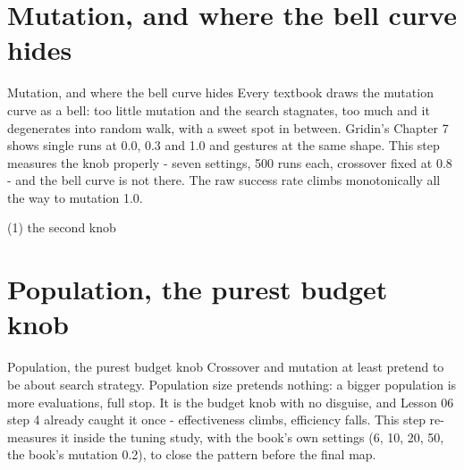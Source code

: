 
\section{Mutation, and where the bell curve hides}

\begin{frame}{Mutation, and where the bell curve hides}
Every textbook draws the mutation curve as a bell: too little mutation and
the search stagnates, too much and it degenerates into random walk, with a
sweet spot in between. Gridin's Chapter 7 shows single runs at 0.0, 0.3 and
1.0 and gestures at the same shape. This step measures the knob properly -
seven settings, 500 runs each, crossover fixed at 0.8 - and the bell curve
is not there. The raw success rate climbs monotonically all the way to
mutation 1.0.
\end{frame}

\begin{frame}[fragile]{(1) the second knob}

\end{frame}


\section{Population, the purest budget knob}

\begin{frame}{Population, the purest budget knob}
Crossover and mutation at least pretend to be about search strategy.
Population size pretends nothing: a bigger population is more evaluations,
full stop. It is the budget knob with no disguise, and Lesson 06 step 4
already caught it once - effectiveness climbs, efficiency falls. This step
re-measures it inside the tuning study, with the book's own settings
(6, 10, 20, 50, the book's mutation 0.2), to close the pattern before the
final map.
\end{frame}

